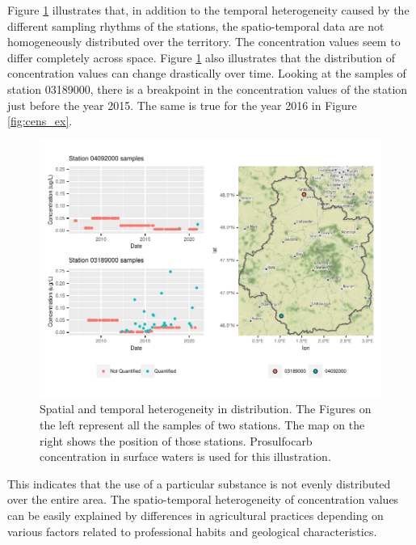 Figure \ref{fig:het_spa_ex} illustrates that, in addition to the temporal heterogeneity caused by the different sampling rhythms of the stations, the spatio-temporal data are not homogeneously distributed over the territory. The concentration values seem to differ completely across space. Figure \ref{fig:het_spa_ex} also illustrates that the distribution of concentration values can change drastically over time. Looking at the samples of station 03189000, there is a breakpoint in the concentration values of the station just before the year 2015. The same is true for the year 2016 in Figure \ref{fig:cens_ex}. 
\begin{figure}[htbp]
    \centering
    \includegraphics{figs/Chap3/Het_resC.pdf}
    \caption{Spatial and temporal heterogeneity in distribution. The Figures on the left represent all the samples of two stations. The map on the right shows the position of those stations. Prosulfocarb concentration in surface waters is used for this illustration.}
    \label{fig:het_spa_ex}
\end{figure}
This indicates that the use of a particular substance is not evenly distributed over the entire area. The spatio-temporal heterogeneity of concentration values can be easily explained by differences in agricultural practices depending on various factors related to professional habits and geological characteristics.


